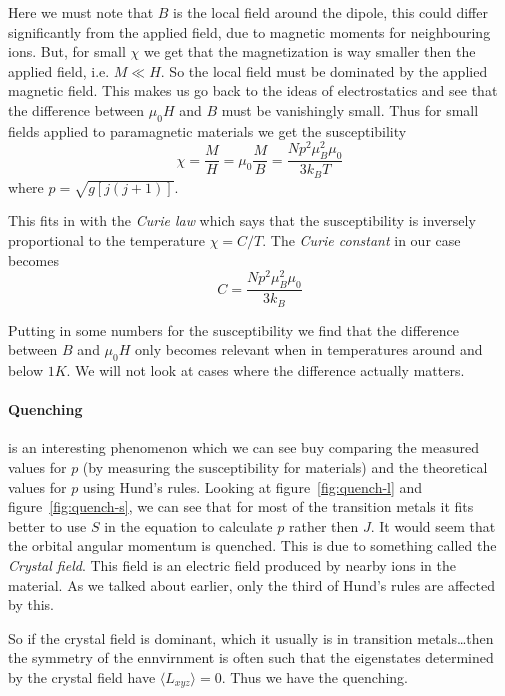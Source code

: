 \documentclass[11pt]{article}
\begin{document}
Here we must note that $B$ is the local field around the dipole, this could differ significantly from the applied field, due to magnetic moments for neighbouring ions. But, for small $\chi$ we get that the magnetization is way smaller then the applied field, i.e. $M \ll H$. So the local field must be dominated by the applied magnetic field. This makes us go back to the ideas of electrostatics and see that the difference between $\mu_0 H$ and $B$ must be vanishingly small. Thus for small fields applied to paramagnetic materials we get the susceptibility
\begin{equation}
	\chi = \frac{M}{H} = \mu_0 \frac{M}{B} = \frac{N p^2 \mu^2_B \mu_0}{3 k_B T}
\end{equation}
where $p = \sqrt{g[j(j+1)]}$. 

This fits in with the \emph{Curie law} which says that the susceptibility is inversely proportional to the temperature $\chi = C/T$. The \emph{Curie constant} in our case becomes
\begin{equation}
	C = \frac{N p^2 \mu^2_B \mu_0}{3 k_B}
\end{equation}

Putting in some numbers for the susceptibility we find that the difference between $B$ and $\mu_0 H$ only becomes relevant when in temperatures around and below $1K$. We will not look at cases where the difference actually matters. 

\paragraph{Quenching} is an interesting phenomenon which we can see buy comparing the measured values for $p$ (by measuring the susceptibility for materials) and the theoretical values for $p$ using Hund's rules. Looking at figure~\ref{fig:quench-l} and figure~\ref{fig:quench-s}, we can see that for most of the transition metals it fits better to use $S$ in the equation to calculate $p$ rather then $J$. It would seem that the orbital angular momentum is quenched. This is due to something called the \emph{Crystal field}. This field is an electric field produced by nearby ions in the material. As we talked about earlier, only the third of Hund's rules are affected by this. 

So if the crystal field is dominant, which it usually is in transition metals\ldots then the symmetry of the ennvirnment is often such that the eigenstates determined by the crystal  field have $\langle L_{xyz} \rangle = 0$. Thus we have the quenching.
\end{document}
